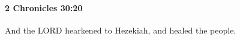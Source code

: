 
		\paragraph{2 Chronicles 30:20} %
			\label{2CHRONICLES-30-20}

			And the LORD hearkened to Hezekiah, and healed the people.


